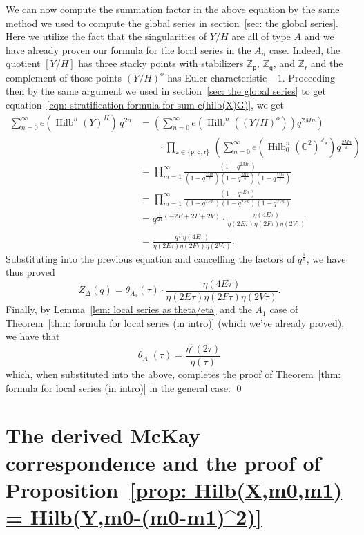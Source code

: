 \documentclass{article}
\theoremstyle{definition}
\newcommand{\CC} {{\mathbb C}}          %
\newcommand{\ZZ} {{\mathbb Z}}		%
\newcommand{\varp}{\mathsf{p}}
\newcommand{\varq}{\mathsf{q}}
\newcommand{\varr}{\mathsf{r}}
\newcommand{\vara}{\mathsf{a}}
\newcommand{\Hilb}{\operatorname{Hilb}}
\begin{document}
We can now compute the summation factor in the above equation by the
same method we used to compute the global series in section~\ref{sec:
the global series}. Here we utilize the fact that the singularities of
$Y/H$ are all of type $A$ and we have already proven our formula for
the local series in the $A_{n}$ case. Indeed, the quotient $[Y/H]$ has
three stacky points with stabilizers $\ZZ_{\varp}$, $\ZZ_{\varq}$, and
$\ZZ_{\varr}$ and the complement of those points $(Y/H)^{o}$ has Euler
characteristic $-1$. Proceeding then by the same argument we used in
section~\ref{sec: the global series} to get equation~\eqref{eqn:
stratification formula for sum e(hilb(X)G)}, we get
\begin{align*}
\sum_{n=0}^{\infty}  e\left(\Hilb^{n}(Y)^{H}\right)\, q^{2n}&=
\left(\sum_{n=0}^{\infty} e\left(\Hilb^{n}\left((Y/H)^{o} \right)
\right) q^{2Mn} \right)  \\
&\quad \quad  \cdot \prod_{\vara \in \{\varp ,\varq
,\varr  \}}\, \left( \sum_{n=0}^{\infty} e\left(\Hilb_{0}^{n}(\CC^{2})^{\ZZ_{\vara }} \right) q^{\frac{2Mn}{\vara }}  \right)\\
&=\prod_{m=1}^{\infty} \frac{\left(1-q^{2Mn} \right)}{\left(1-q^{\frac{2Mn}{\varp}} \right)\left(1-q^{\frac{2Mn}{\varq}} \right)\left(1-q^{\frac{2Mn}{\varr}} \right)}\\
&=\prod_{m=1}^{\infty} \frac{\left(1-q^{4En} \right)}{\left(1-q^{2En} \right)\left(1-q^{2Fn} \right)\left(1-q^{2Vn} \right)}\\
&=q^{\frac{1}{24}(-2E+2F+2V)}\cdot  \frac{\eta (4E\tau )}{\eta (2E\tau )\eta
(2F\tau )\eta (2V\tau )} \\
&=  \frac{q^{\frac{1}{6}}\,\eta (4E\tau )}{\eta (2E\tau )\eta
(2F\tau )\eta (2V\tau )}.
\end{align*}
Substituting into the previous equation and cancelling the factors of
$q^{\frac{1}{6}}$, we have thus proved
\[
Z_{\Delta}(q) = \theta_{A_{1}}(\tau )\cdot \frac{\eta (4E\tau )}{\eta
(2E\tau )\eta (2F\tau )\eta (2V\tau )}.
\]
Finally, by Lemma~\ref{lem: local series as theta/eta} and the $A_{1}$
case of Theorem~\ref{thm: formula for local series (in intro)} (which
we've already proved), we have that 
\[
\theta_{A_{1}}(\tau ) =\frac{\eta^{2}(2\tau )}{\eta (\tau )}
\]
which, when substituted into the above, completes the proof of
Theorem~\ref{thm: formula for local series (in intro)} in the general
case. \qed 



\section{The derived McKay correspondence and the proof of
Proposition~\ref{prop: Hilb(X,m0,m1) =
Hilb(Y,m0-(m0-m1)^2)}}\label{sec: McKay correspondence}
\end{document}
